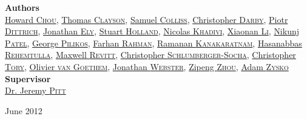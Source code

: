 \begin{titlepage}
\begin{center}
\textbf{Authors}\\
\vspace{5pt}
\href{mailto:howard.chou09@imperial.ac.uk}{Howard \textsc{Chou}}, 
\href{mailto:thomas.clayson08@imperial.ac.uk}{Thomas \textsc{Clayson}},
\href{mailto:samuel.colliss09@imperial.ac.uk}{Samuel \textsc{Colliss}}, 
\href{mailto:christopher.darby08@imperial.ac.uk}{Christopher \textsc{Darby}}, 
\href{mailto:piotr.dittrich09@imperial.ac.uk}{Piotr \textsc{Dittrich}}, 
\href{mailto:jonathan.ely09@imperial.ac.uk}{Jonathan \textsc{Ely}}, 
\href{mailto:stuart.holland09@imperial.ac.uk}{Stuart \textsc{Holland}}, 
\href{mailto:nicolas.khadivi09@imperial.ac.uk}{Nicolas \textsc{Khadivi}}, 
\href{mailto:xiaonan.li08@imperial.ac.uk}{Xiaonan \textsc{Li}}, 
\href{mailto:nikunj.patel09@imperial.ac.uk}{Nikunj \textsc{Patel}},
\href{mailto:george.pilikos08@imperial.ac.uk}{George \textsc{Pilikos}}, 
\href{mailto:farhan.rahman09@imperial.ac.uk}{Farhan \textsc{Rahman}}, 
\href{mailto:kanakaratnam.ramanan09@imperial.ac.uk}{Ramanan \textsc{Kanakaratnam}}, 
\href{mailto:hasanabbas.rehemtulla09@imperial.ac.uk}{Hasanabbas \textsc{Rehemtulla}}, 
\href{mailto:maxwell.revitt09@imperial.ac.uk}{Maxwell \textsc{Revitt}}, 
\href{mailto:chris.socha09@imperial.ac.uk}{Christopher \textsc{Schlumberger-Socha}}, 
\href{mailto:christopher.tory09@imperial.ac.uk}{Christopher \textsc{Tory}}, 
\href{mailto:olivier.van-goethem09@imperial.ac.uk}{Olivier \textsc{van Goethem}}, 
\href{mailto:jonathan.webster08@imperial.ac.uk}{Jonathan \textsc{Webster}}, 
\href{mailto:zipeng.zhou08@imperial.ac.uk}{Zipeng \textsc{Zhou}}, 
\href{mailto:adam.zysko09@imperial.ac.uk}{Adam \textsc{Zysko}} \\ \vfill
\textbf{Supervisor} \\
\vspace{5pt}
\href{mailto:j.pitt@imperial.ac.uk}{Dr. Jeremy \textsc{Pitt}}


\vfill

{\large June 2012}

\end{center}
\end{titlepage}

